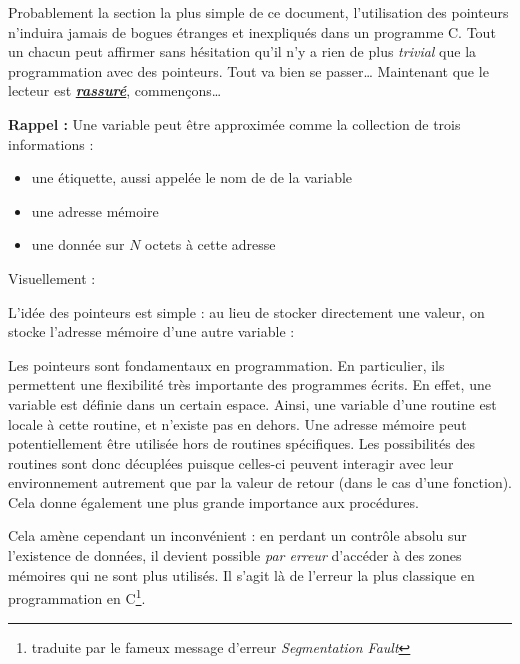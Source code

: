 \documentclass[../../../main.tex]{subfiles}
\begin{document}
Probablement la section la plus simple de ce document, l'utilisation des pointeurs n'induira jamais de bogues étranges et inexpliqués dans un programme C. Tout un chacun peut affirmer sans hésitation qu'il n'y a rien de plus \textit{trivial} que la programmation avec des pointeurs.\newline
Tout va bien se passer\dots\newline
Maintenant que le lecteur est \textbf{\underline{\textit{rassuré}}}, commençons\dots
 
\textbf{Rappel :} Une variable peut être approximée comme la collection de trois informations :
\begin{itemize}
	\item une étiquette, aussi appelée le nom de de la variable
	\item une adresse mémoire
	\item une donnée sur $N$ octets à cette adresse
\end{itemize}
Visuellement : 

\begin{minipage}{\textwidth}
	\begin{center}
		
	\end{center}
\end{minipage} 

L'idée des pointeurs est simple : au lieu de stocker directement une valeur, on stocke l'adresse mémoire d'une autre variable :
 
\begin{minipage}{\textwidth}
	\begin{center}
		
	\end{center}
\end{minipage}
 
Les pointeurs sont fondamentaux en programmation. En particulier, ils permettent une flexibilité très importante des programmes écrits. En effet, une variable est définie dans un certain espace. Ainsi, une variable d'une routine est locale à cette routine, et n'existe pas en dehors. Une adresse mémoire peut potentiellement être utilisée hors de routines spécifiques. Les possibilités des routines sont donc décuplées puisque celles-ci peuvent interagir avec leur environnement autrement que par la valeur de retour (dans le cas d'une fonction). Cela donne également une plus grande importance aux procédures.

Cela amène cependant un inconvénient : en perdant un contrôle absolu sur l'existence de données, il devient possible \textit{par erreur} d'accéder à des zones mémoires qui ne sont plus utilisés. Il s'agit là de l'erreur la plus classique en programmation en C\footnote{traduite par le fameux message d'erreur \textit{Segmentation Fault}}.
 
\end{document}
